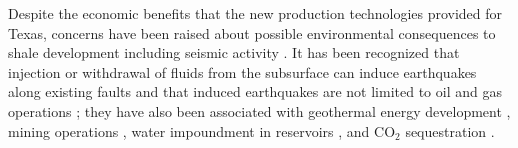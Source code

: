 Despite the economic benefits that the new production technologies provided for Texas, concerns have been raised about possible environmental consequences to shale development including seismic activity
 \cite{TheAcademyofMedicine2017EnvironmentalCommunityImpacts, Scanlon2020WillWaterIssues}. 
It has been recognized that injection or withdrawal of fluids from the subsurface can induce earthquakes along existing faults \citep{Ellsworth2013InjectionInducedEarthquakes, Simpson1988TwoTypesReservoir}
and that induced earthquakes are not limited to oil and gas operations \citep{Grigoli2017CurrentChallengesMonitoring, Foulger2018GlobalReviewHuman, Baan2017HumanInducedSeismicity}; they have also been associated with geothermal energy development \citep{Deichmann2009EarthquakesInducedStimulation}, mining operations \citep{Hasegawa1989InducedSeismicityMines}, water impoundment in reservoirs \citep{Talwani1997NatureReservoirInduced}, and CO$_2$ sequestration \citep{Gan2013GasInjectionMay}.






% 


